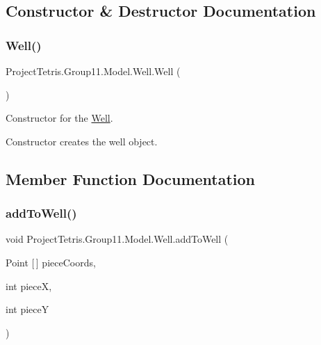 \subsection{Constructor \& Destructor Documentation}
\hypertarget{class_project_tetris_1_1_group11_1_1_model_1_1_well_ad2e8ce275ae537968a865f4bc4353455}{}\label{class_project_tetris_1_1_group11_1_1_model_1_1_well_ad2e8ce275ae537968a865f4bc4353455} 
\subsubsection{\texorpdfstring{Well()}{Well()}}
{\footnotesize\ttfamily Project\+Tetris.\+Group11.\+Model.\+Well.\+Well (\begin{DoxyParamCaption}{ }\end{DoxyParamCaption})}



Constructor for the \hyperlink{class_project_tetris_1_1_group11_1_1_model_1_1_well}{Well}. 

Constructor creates the well object. 

\subsection{Member Function Documentation}
\hypertarget{class_project_tetris_1_1_group11_1_1_model_1_1_well_a2b6fbb33b9636deb0389481b90ad6ac3}{}\label{class_project_tetris_1_1_group11_1_1_model_1_1_well_a2b6fbb33b9636deb0389481b90ad6ac3} 
\subsubsection{\texorpdfstring{add\+To\+Well()}{addToWell()}}
{\footnotesize\ttfamily void Project\+Tetris.\+Group11.\+Model.\+Well.\+add\+To\+Well (\begin{DoxyParamCaption}\item[{Point \mbox{[}$\,$\mbox{]}}]{piece\+Coords,  }\item[{int}]{pieceX,  }\item[{int}]{pieceY }\end{DoxyParamCaption})}



